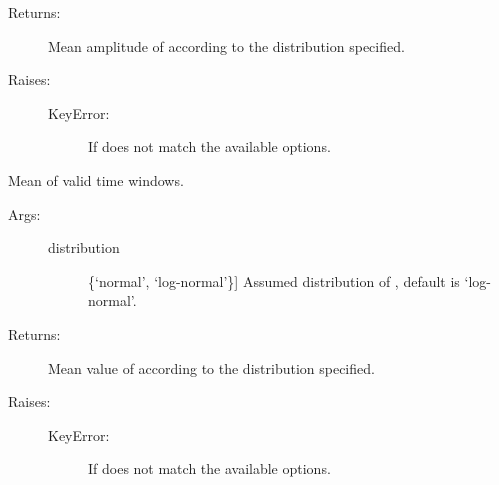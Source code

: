 \documentclass[letterpaper,10pt,english,openany,oneside]{sphinxmanual}
\begin{document}
\begin{fulllineitems}
\begin{fulllineitems}
\begin{description}
\begin{description}
\end{description}

\item[{Returns:}] \leavevmode
Mean amplitude of  according to the distribution
specified.

\item[{Raises:}] \leavevmode\begin{description}
\item[{KeyError:}] \leavevmode
If  does not match the available options.

\end{description}

\end{description}

\end{fulllineitems}


\begin{fulllineitems}
\label{\detokenize{index:hvsrpy.Hvsr.mean_f0_frq}}
Mean  of valid time windows.
\begin{description}
\item[{Args:}] \leavevmode\begin{description}
\item[{distribution}] \leavevmode{[}\{‘normal’, ‘log-normal’\}{]}
Assumed distribution of , default is ‘log-normal’.

\end{description}

\item[{Returns:}] \leavevmode
Mean value of  according to the distribution specified.

\item[{Raises:}] \leavevmode\begin{description}
\item[{KeyError:}] \leavevmode
If  does not match the available options.

\end{description}

\end{description}

\end{fulllineitems}


\end{fulllineitems}
\end{document}
